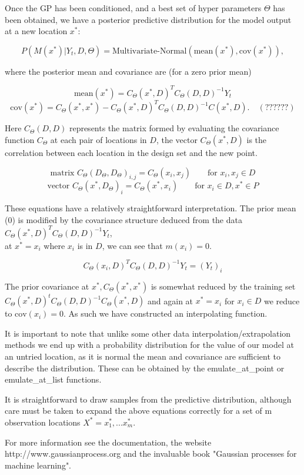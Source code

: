 \documentclass{article}
\begin{document}
Once the GP has been conditioned, and a best set of hyper parameters
$Θ$ has been obtained, we have a posterior predictive distribution
for the model output at a new location $x^*$:

\[P(M(x^*) | Y_t, D, Θ) = \textrm{Multivariate-Normal}(\textrm{mean}(x^*), \textrm{cov}(x^*)), \]

where the posterior mean and covariance are (for a zero prior mean)

\[ \textrm{mean}(x^*) = C_Θ(x^*,D)^T  C_Θ(D,D)^{-1} Y_t \]
\[ \textrm{cov}(x^*) = C_Θ(x^*,x^*) - C_Θ(x^*,D)^T C_Θ(D,D)^{-1} C(x^*,D). \quad (??????) \]

Here $C_Θ(D,D)$ represents the matrix formed by evaluating the
covariance function $C_Θ$ at each pair of locations in $D$, the vector
$C_Θ(x^*,D)$ is the correlation between each location in the design
set and the new point.

\[ \textrm{matrix } C_Θ(D_Θ,D_Θ)_{i,j} = C_Θ(x_i,x_j) \qquad \textrm{for } x_i,x_j ∈ D \]
\[ \textrm{vector } C_Θ(x^*,D_Θ)_{i} = C_Θ(x^*,x_i) \qquad \textrm{for } x_i ∈ D, x^* ∈ P \]

These equations have a relatively straightforward interpretation. The
prior mean (0) is modified by the covariance structure deduced from
the data \\
$C_Θ(x^*,D)^T C_Θ(D,D)^{-1} Y_t$, \\
at $x^* = x_i$ where $x_i$ is in $D$,
we can see that $m(x_i) = 0$.

\[ C_Θ(x_i,D)^T C_Θ(D,D)^{-1} Y_t = (Y_t)_i \]

 The prior covariance at $x^*, C_Θ(x^*,x^*)$ is
somewhat reduced by the training set $C_Θ(x^*,D)^t C_Θ(D,D)^{-1}
C_Θ(x^*,D)$ and again at $x^*=x_i$ for $x_i∈D$ we reduce to $\textrm{cov}(x_i) =
0$. As such we have constructed an interpolating function.

It is important to note that unlike some other data
interpolation/extrapolation methods we end up with a probability
distribution for the value of our model at an untried location, as it
is normal the mean and covariance are sufficient to describe the
distribution. These can be obtained by the emulate\_at\_point or
emulate\_at\_list functions.

It is straightforward to draw samples from the predictive
distribution, although care must be taken to expand the above
equations correctly for a set of m observation locations
$X^* = {x^*_1, ... x^*_m}$.

For more information see the documentation, the website
http://www.gaussianprocess.org and the invaluable book "Gaussian
processes for machine learning".
\end{document}
